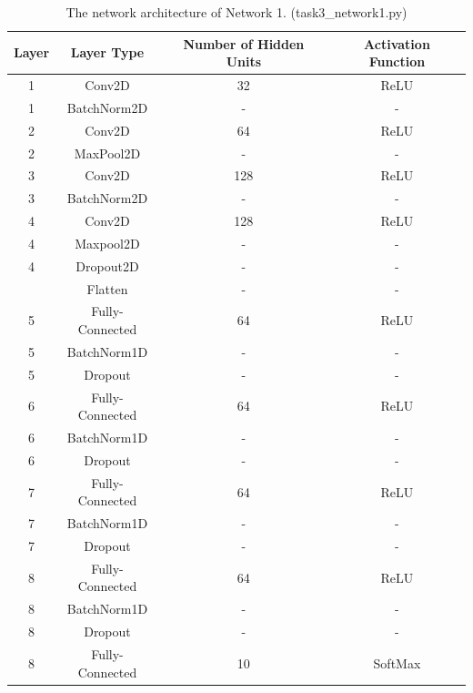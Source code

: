 \documentclass{article}
\begin{document}
\begin{table}[H]
\centering
\caption{The network architecture of Network 1. (task3_network1.py)}
\label{tab:network1}
\begin{tabular}{c|c|c|c}
\textbf{Layer} & \textbf{Layer Type} & \textbf{Number of Hidden Units} & \textbf{Activation Function} \\ \hline
1 & Conv2D & 32 & ReLU \\
1 & BatchNorm2D & - & - \\
2 & Conv2D & 64 & ReLU \\
2 & MaxPool2D & - & - \\
3 & Conv2D & 128 & ReLU \\
3 & BatchNorm2D & - & - \\
4 & Conv2D & 128 & ReLU \\
4 & Maxpool2D & - & - \\
4 & Dropout2D & - & - \\\hline

 & Flatten & - & - \\
5 & Fully-Connected & 64 & ReLU \\
5 & BatchNorm1D & - & - \\
5 & Dropout & - & - \\
6 & Fully-Connected & 64 & ReLU \\
6 & BatchNorm1D & - & - \\
6 & Dropout & - & - \\
7 & Fully-Connected & 64 & ReLU \\
7 & BatchNorm1D & - & - \\
7 & Dropout & - & - \\
8 & Fully-Connected & 64 & ReLU \\
8 & BatchNorm1D & - & - \\
8 & Dropout & - & - \\
8 & Fully-Connected & 10 & SoftMax \\
\end{tabular}
\end{table}

\begin{table}[H]
\centering
\caption{Training parameters used when training Network 1.}
\label{tab:net1trainparam}
\end{table}
\end{document}
